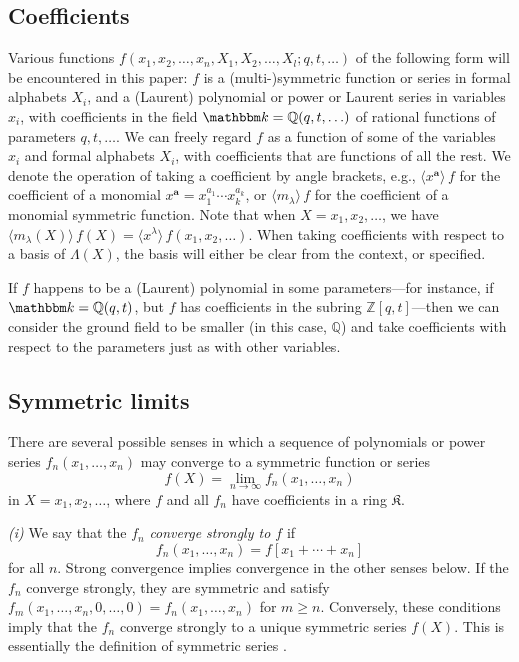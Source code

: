 \documentclass[12pt]{amsart}
\theoremstyle{definition}
\theoremstyle{remark}
\newcommand{\multisymmetric}{(multi\mbox{-})symmetric }
\newcommand{\QQ}{{\mathbb Q}}
\newcommand{\ZZ}{{\mathbb Z}}
\newcommand{\kk}{{\mathbbm k}}
\newcommand{\aA}{{\mathbf a}}
\newcommand{\Kfrak}{{\mathfrak K}}
\begin{document}
\subsection{Coefficients}
\label{ss:coefficients}

Various functions $f(x_{1},x_{2},\ldots, x_{n}, X_{1}, X_{2},\ldots ,
X_{l} ; q, t,\ldots )$ of the following form will be encountered in
this paper: $f$ is a \multisymmetric function or series in formal
alphabets $X_{i}$, and a (Laurent) polynomial or power or Laurent
series in variables $x_{i}$, with coefficients in the field $\kk =\QQ
(q,t,\ldots)$ of rational functions of parameters $q,t,\ldots $.  We
can freely regard $f$ as a function of some of the variables $x_{i}$
and formal alphabets $X_{i}$, with coefficients that are functions of
all the rest.  We denote the operation of taking a coefficient by
angle brackets, e.g., $\langle x^{\aA } \rangle \, f$ for the
coefficient of a monomial $x^{\aA } = x_{1}^{a_{1}}\cdots
x_{k}^{a_{k}}$, or $\langle m_{\lambda } \rangle \, f$ for the
coefficient of a monomial symmetric function.  Note that when $X =
x_{1}, x_{2}, \ldots$, we have $\langle m_{\lambda }(X) \rangle \,
f(X) = \langle x^{\lambda } \rangle \, f(x_{1},x_{2},\ldots )$.  When
taking coefficients with respect to a basis of $\Lambda (X)$, the
basis will either be clear from the context, or specified.

If $f$ happens to be a (Laurent) polynomial in some parameters---for
instance, if $\kk =\QQ (q,t)$, but $f$ has coefficients in the subring
$\ZZ [q,t]$---then we can consider the ground field to be smaller (in
this case, $\QQ $) and take coefficients with respect to the
parameters just as with other variables.


\subsection{Symmetric limits}
\label{ss:limits}

There are several possible senses in which a sequence of polynomials
or power series $f_{n}(x_{1},\ldots,x_{n})$ may converge to a
symmetric function or series
\begin{equation}\label{e:limit}
f(X) = \lim_{n\rightarrow \infty } f_{n}(x_{1},\ldots,x_{n})
\end{equation}
in $X = x_{1}, x_{2}, \ldots $, where $f$ and all $f_{n}$ have
coefficients in a ring $\Kfrak $.

{\it (i) } We say that the $f_{n}$ {\em converge strongly to $f$} if
\begin{equation}\label{e:strong-convergence}
f_{n}(x_{1},\ldots,x_{n}) = f[x_{1}+\cdots +x_{n}]
\end{equation}
for all $n$.  Strong convergence implies convergence in the other
senses below.  If the $f_{n}$ converge strongly, they are symmetric
and satisfy $f_{m}(x_{1},\ldots,x_{n},0,\ldots,0) =
f_{n}(x_{1},\ldots,x_{n})$ for $m\geq n$.  Conversely, these
conditions imply that the $f_{n}$ converge strongly to a unique
symmetric series $f(X)$.  This is essentially the definition of
symmetric series \cite[I.2, pp.~18-19]{Macdonald95}.
\end{document}
